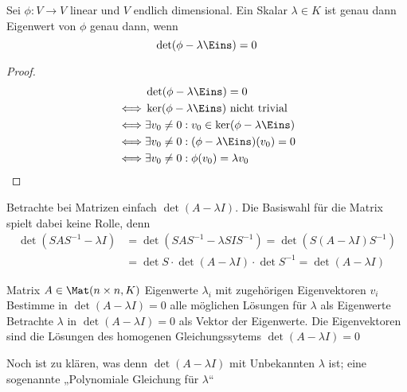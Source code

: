 \documentclass{mycourse}
\begin{document}
\begin{prop}
\label{prop:10.4}
Sei $\phi:V\to V$ linear und $V$ endlich dimensional.
Ein Skalar $\lambda\in K$ ist genau dann Eigenwert von $\phi$ genau dann, wenn
\[
\det(\phi-\lambda\Eins)=0
\]
\begin{proof}
\begin{align*}
&\det(\phi-\lambda\Eins)=0\\
\iff& \ker(\phi-\lambda\Eins) \text{ nicht trivial}\\
\iff& \exists v_0\neq 0:v_0\in \ker(\phi-\lambda\Eins)\\
\iff& \exists v_0\neq 0:(\phi-\lambda\Eins)(v_0)=0\\
\iff& \exists v_0\neq 0:\phi(v_0)=\lambda v_0
\end{align*}
\end{proof}
\end{prop}

\begin{note}
Betrachte bei Matrizen einfach $\det(A-\lambda I)$.
Die Basiswahl für die Matrix spielt dabei keine Rolle, denn
\begin{align*}
\det(SAS^{-1}-\lambda I)&= \det(SAS^{-1}-\lambda SIS^{-1})=\det(S(A-\lambda I)S^{-1}) \\
&=\det S\cdot\det (A-\lambda I)\cdot \det S^{-1} = \det(A-\lambda I)
\end{align*}
\end{note}

\begin{alg*}
	\begin{algorithmic}
		\Input Matrix $A\in \Mat(n\times n,K)$
		\Output Eigenwerte $\lambda_i$ mit zugehörigen Eigenvektoren $v_i$
		\Statex
		\State Bestimme in $\det(A-\lambda I)=0$ alle möglichen Lösungen für $\lambda$ als Eigenwerte
		\State Betrachte $\lambda$ in $\det(A-\lambda I)=0$ als Vektor der Eigenwerte.
		\State Die Eigenvektoren sind die Lösungen des homogenen Gleichungssytems $\det(A-\lambda I)=0$
	\end{algorithmic}
\end{alg*}

\begin{note}
Noch ist zu klären, was denn $\det(A-\lambda I)$ mit Unbekannten $\lambda$ ist; eine sogenannte „Polynomiale Gleichung für $\lambda$“
\end{note}
\end{document}
